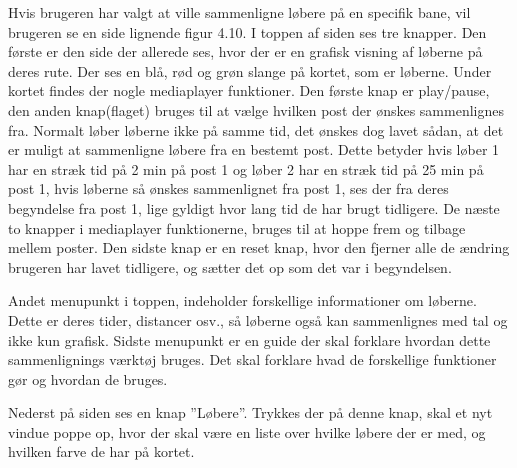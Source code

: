 Hvis brugeren har valgt at ville sammenligne løbere på en specifik bane, vil brugeren se en side lignende figur 4.10. I toppen af siden ses tre knapper. Den første er den side der allerede ses, hvor der er en grafisk visning af løberne på deres rute. Der ses en blå, rød og grøn slange på kortet, som er løberne. Under kortet findes der nogle mediaplayer funktioner. Den første knap er play/pause, den anden knap(flaget) bruges til at vælge hvilken post der ønskes sammenlignes fra. Normalt løber løberne ikke på samme tid, det ønskes dog lavet sådan, at det er muligt at sammenligne løbere fra en bestemt post. Dette betyder hvis løber 1 har en stræk tid på 2 min på post 1 og løber 2 har en stræk tid på 25 min på post 1, hvis løberne så ønskes sammenlignet fra post 1, ses der fra deres begyndelse fra post 1, lige gyldigt hvor lang tid de har brugt tidligere. De næste to knapper i mediaplayer funktionerne, bruges til at hoppe frem og tilbage mellem poster. Den sidste knap er en reset knap, hvor den fjerner alle de ændring brugeren har lavet tidligere, og sætter det op som det var i begyndelsen.  

Andet menupunkt i toppen, indeholder forskellige informationer om løberne. Dette er deres tider, distancer osv., så løberne også kan sammenlignes med tal og ikke kun grafisk. Sidste menupunkt er en guide der skal forklare hvordan dette sammenlignings værktøj bruges. Det skal forklare hvad de forskellige funktioner gør og hvordan de bruges.

Nederst på siden ses en knap ”Løbere”. Trykkes der på denne knap, skal et nyt vindue poppe op, hvor der skal være en liste over hvilke løbere der er med, og hvilken farve de har på kortet.
